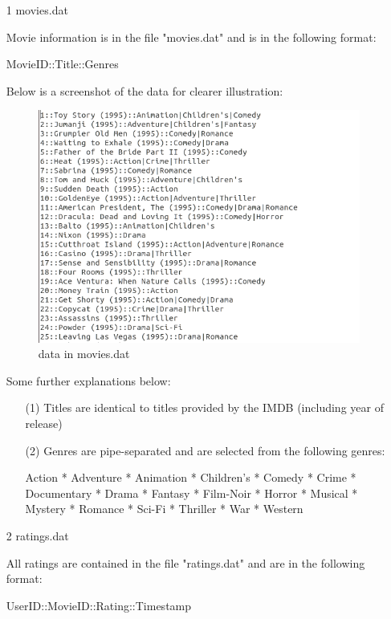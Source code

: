 \documentclass[two column]{article}
\begin{document}
\begin{itemize}
\item[1] movies.dat
\par Movie information is in the file "movies.dat" and is in the following format:
\par MovieID::Title::Genres

\par Below is a screenshot of the data for clearer illustration:
\begin{figure}[H]
\centering
\caption{data in movies.dat}
\includegraphics[width = 0.95\linewidth]{p1.png}
\end{figure}

\par Some further explanations below:
\begin{itemize}
\item[(1)] Titles are identical to titles provided by the IMDB (including year of release)

\item[(2)] Genres are pipe-separated and are selected from the following genres:
\par * Action
	* Adventure
	* Animation
	* Children's
	* Comedy
	* Crime
	* Documentary
	* Drama
	* Fantasy
	* Film-Noir
	* Horror
	* Musical
	* Mystery
	* Romance
	* Sci-Fi
	* Thriller
	* War
	* Western
\end{itemize}


\item[2] ratings.dat
\par All ratings are contained in the file "ratings.dat" and are in the following format:
\par UserID::MovieID::Rating::Timestamp


\end{itemize}
\end{document}
